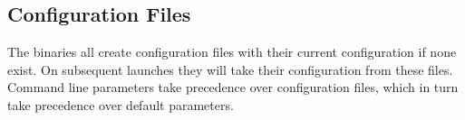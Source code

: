 \subsection*{Configuration Files}
The binaries all create configuration files with their current configuration if none exist.
On subsequent launches they will take their configuration from these files.
Command line parameters take precedence over configuration files, which in turn take precedence over default parameters.
